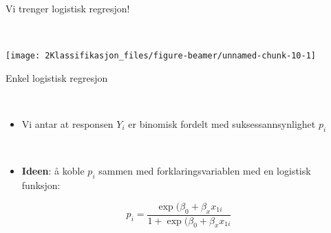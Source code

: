 \documentclass[10pt,ignorenonframetext,]{beamer}
\providecommand{\tightlist}{%
  \setlength{\itemsep}{0pt}\setlength{\parskip}{0pt}}
\begin{document}
\begin{frame}

\begin{block}{Vi trenger logistisk regresjon!}

\(~\)

\begin{center}\texttt{[image: 2Klassifikasjon\_files/figure-beamer/unnamed-chunk-10-1]} \end{center}

\end{block}

\end{frame}

\begin{frame}

\begin{block}{Enkel logistisk regresjon}

\(~\)

\begin{itemize}
\tightlist
\item
  Vi antar at responsen \(Y_i\) er binomisk fordelt med
  suksessannsynlighet \(p_i\)
\end{itemize}

\(~\)

\begin{itemize}
\tightlist
\item
  \textbf{Ideen}: å koble \(p_i\) sammen med forklaringsvariablen med en
  logistisk funksjon:
\end{itemize}

\[p_i = \frac{\exp(\beta_0 + \beta_x x_{1i}}{1+ \exp(\beta_0 + \beta_x x_{1i}} \]

\end{block}

\end{frame}
\end{document}
